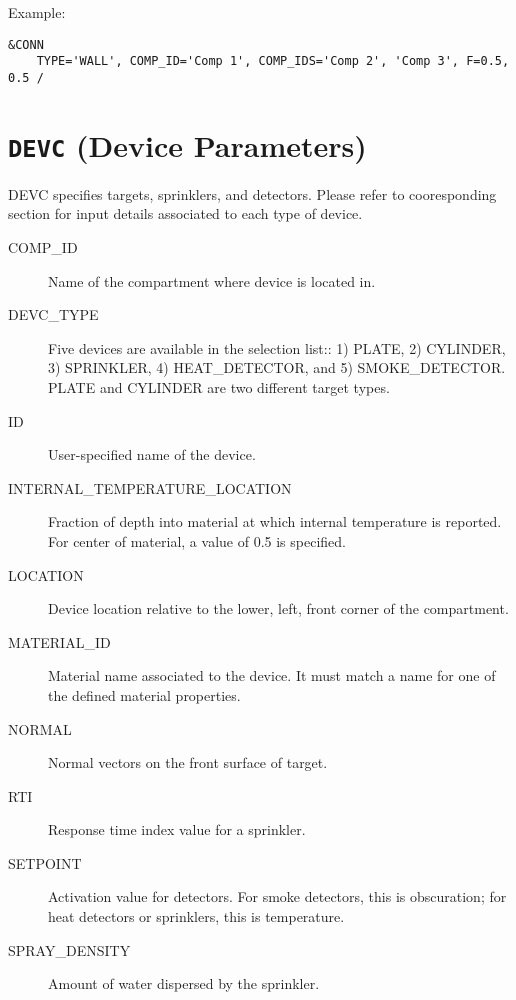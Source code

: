 \noindent Example:
\begin{lstlisting}
&CONN 
	TYPE='WALL', COMP_ID='Comp 1', COMP_IDS='Comp 2', 'Comp 3', F=0.5, 0.5 /
\end{lstlisting}

\vspace{\baselineskip}


\section{\texorpdfstring{{\tt DEVC}}{DEVC} (Device Parameters)}

DEVC specifies targets, sprinklers, and detectors. Please refer to cooresponding section for input details associated to each type of device. 

\begin{adjustwidth}{1cm}{0cm}
\begin{description}
  \item[COMP\_ID] Name of the compartment where device is located in.
  \item[DEVC\_TYPE] Five devices are available in the selection list:: 1) PLATE, 2) CYLINDER, 3) SPRINKLER, 4) HEAT\_DETECTOR, and 5) SMOKE\_DETECTOR. PLATE and CYLINDER are two different target types.
  \item[ID] User-specified name of the device.
  \item[INTERNAL\_TEMPERATURE\_LOCATION] Fraction of depth into material at which internal temperature is reported. For center of material, a value of 0.5 is specified.
  \item[LOCATION] Device location relative to the lower, left, front corner of the compartment.
  \item[MATERIAL\_ID] Material name associated to the device. It must match a name for one of the defined material properties.
  \item[NORMAL] Normal vectors on the front surface of target.
  \item[RTI] Response time index value for a sprinkler.
  \item[SETPOINT] Activation value for detectors. For smoke detectors, this is obscuration; for heat detectors or sprinklers, this is temperature.
  \item[SPRAY\_DENSITY] Amount of water dispersed by the sprinkler.
\end{description}
\end{adjustwidth}

\vspace{\baselineskip}

